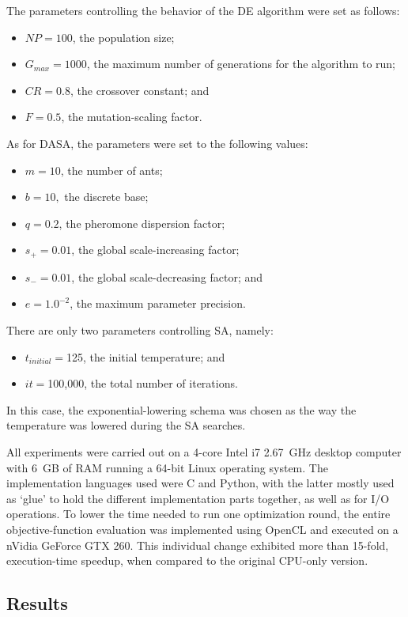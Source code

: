 The parameters controlling the behavior of the DE algorithm were set
as follows:
\begin{itemize}
\item $NP=100$, the population size;
\item $G_{max}=1000$, the maximum number of generations for the algorithm
to run;
\item $CR=0.8$, the crossover constant; and
\item $F=0.5$, the mutation-scaling factor.
\end{itemize}
As for DASA, the parameters were set to the following values:
\begin{itemize}
\item $m=10$, the number of ants;
\item $b=10,$ the discrete base;
\item $q=0.2$, the pheromone dispersion factor;
\item $s_{+}=0.01$, the global scale-increasing factor;
\item $s_{-}=0.01$, the global scale-decreasing factor; and 
\item $e=1.0^{-2}$, the maximum parameter precision.
\end{itemize}
There are only two parameters controlling SA, namely:
\begin{itemize}
\item $t_{initial}=$125, the initial temperature; and
\item $it=$100,000, the total number of iterations.
\end{itemize}
In this case, the exponential-lowering schema was chosen as the way
the temperature was lowered during the SA searches.

\bigskip{}


All experiments were carried out on a 4-core Intel i7 2.67~GHz desktop
computer with 6~GB of RAM running a 64-bit Linux operating system.
The implementation languages used were C and Python, with the latter
mostly used as \textquoteleft{}glue\textquoteright{} to hold the different
implementation parts together, as well as for I/O operations. To lower
the time needed to run one optimization round, the entire objective-function
evaluation was implemented using OpenCL and executed on a nVidia GeForce
GTX 260. This individual change exhibited more than 15-fold, execution-time
speedup, when compared to the original CPU-only version.


\subsection{Results \label{sub:07-Results}}

